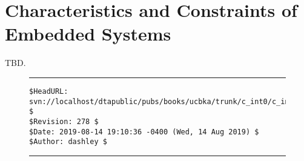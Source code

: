 \section{Characteristics and Constraints of Embedded Systems}
\label{cint0:sccn0}

TBD.


\noindent\begin{figure}[!b]
\noindent\rule[-0.25in]{\textwidth}{1pt}
\begin{tiny}
\begin{verbatim}
$HeadURL: svn://localhost/dtapublic/pubs/books/ucbka/trunk/c_int0/c_int0.tex $
$Revision: 278 $
$Date: 2019-08-14 19:10:36 -0400 (Wed, 14 Aug 2019) $
$Author: dashley $
\end{verbatim}
\end{tiny}
\noindent\rule[0.25in]{\textwidth}{1pt}
\end{figure}

%
